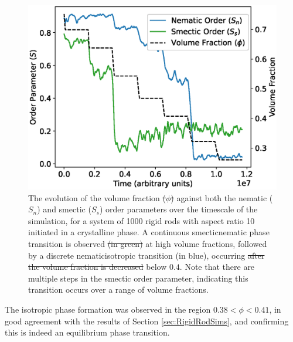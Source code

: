 \documentclass[11pt, a4paper]{article} %
\providecommand{\DIFadd}[1]{{\protect\color{blue}\uwave{#1}}} %
\providecommand{\DIFdel}[1]{{\protect\color{red}\sout{#1}}}                      %
\providecommand{\DIFaddFL}[1]{\DIFadd{#1}} %
\providecommand{\DIFdelFL}[1]{\DIFdel{#1}} %
\providecommand{\DIFaddbeginFL}{} %
\providecommand{\DIFaddendFL}{} %
\providecommand{\DIFdelbeginFL}{} %
\providecommand{\DIFdelendFL}{} %
\begin{document}
\begin{figure} [h!]
	\centering
	\includegraphics[width=0.7\linewidth]{Figures/rigidrod_cryorderparam}
	\caption{The evolution of the volume fraction \DIFdelbeginFL \DIFdelFL{($\phi$) }\DIFdelendFL against both the nematic ($S_{n}$) and smectic ($S_{s}$) order parameters over the timescale of the simulation, for a system of 1000 rigid rods with aspect ratio 10 initiated in a crystalline phase. A continuous smectic\textendash nematic phase transition is observed \DIFdelbeginFL \DIFdelFL{(in green) }\DIFdelendFL at high volume fractions, followed by a discrete nematic\textendash isotropic transition (in blue), occurring \DIFdelbeginFL \DIFdelFL{after the volume fraction is decreased }\DIFdelendFL \DIFaddbeginFL \DIFaddFL{\textcolor{forestgreen}{when $\phi$ decreased} }\DIFaddendFL below $0.4$. Note that there are multiple steps in the smectic order parameter, indicating this transition occurs over a range of volume fractions.}
	\label{fig:rr_crystalorder}
\end{figure} %


The isotropic phase formation was observed in the region $0.38 < \phi< 0.41$, in good agreement with the results of Section \ref{sec:RigidRodSims}, and confirming this is indeed an equilibrium phase transition. 
\end{document}
